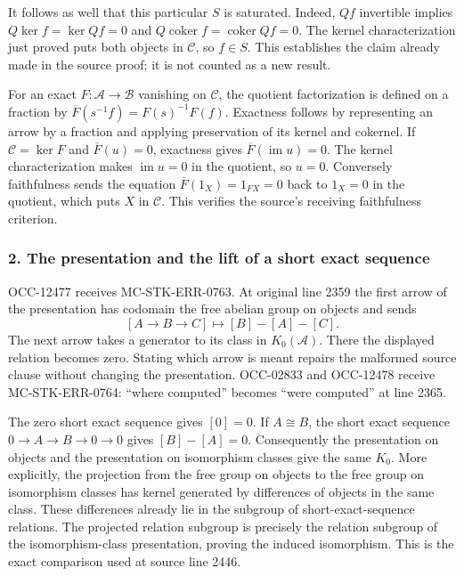 It follows as well that this particular \(S\) is saturated. Indeed, \(Qf\) invertible implies \(Q\ker f=\ker Qf=0\) and \(Q\operatorname{coker}f=\operatorname{coker}Qf=0\). The kernel characterization just proved puts both objects in \(\mathcal C\), so \(f\in S\). This establishes the claim already made in the source proof; it is not counted as a new result.

For an exact \(F:\mathcal A\to\mathcal B\) vanishing on \(\mathcal C\), the quotient factorization is defined on a fraction by \(\overline F(s^{-1}f)=F(s)^{-1}F(f)\). Exactness follows by representing an arrow by a fraction and applying preservation of its kernel and cokernel. If \(\mathcal C=\ker F\) and \(\overline F(u)=0\), exactness gives \(\overline F(\operatorname{im}u)=0\). The kernel characterization makes \(\operatorname{im}u=0\) in the quotient, so \(u=0\). Conversely faithfulness sends the equation \(\overline F(1_X)=1_{FX}=0\) back to \(1_X=0\) in the quotient, which puts \(X\) in \(\mathcal C\). This verifies the source's receiving faithfulness criterion.

\subsubsection{2. The presentation and the lift of a short exact sequence}\label{the-presentation-and-the-lift-of-a-short-exact-sequence}

OCC-12477 receives MC-STK-ERR-0763. At original line 2359 the first arrow of the presentation has codomain the free abelian group on objects and sends \[
[A\to B\to C]\longmapsto[B]-[A]-[C].
\] The next arrow takes a generator to its class in \(K_0(\mathcal A)\). There the displayed relation becomes zero. Stating which arrow is meant repairs the malformed source clause without changing the presentation. OCC-02833 and OCC-12478 receive MC-STK-ERR-0764: ``where computed'' becomes ``were computed'' at line 2365.

The zero short exact sequence gives \([0]=0\). If \(A\cong B\), the short exact sequence \(0\to A\to B\to0\to0\) gives \([B]-[A]=0\). Consequently the presentation on objects and the presentation on isomorphism classes give the same \(K_0\). More explicitly, the projection from the free group on objects to the free group on isomorphism classes has kernel generated by differences of objects in the same class. These differences already lie in the subgroup of short-exact-sequence relations. The projected relation subgroup is precisely the relation subgroup of the isomorphism-class presentation, proving the induced isomorphism. This is the exact comparison used at source line 2446.

